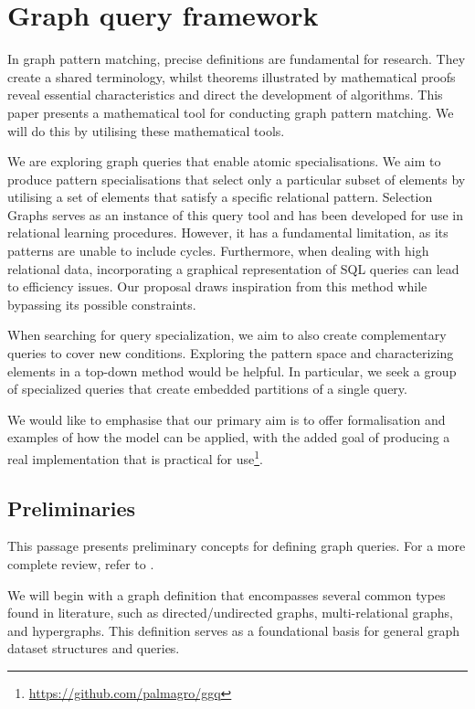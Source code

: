 \documentclass{article}%
\begin{document}
%
\clearpage%
\section{Graph query framework}
\label{ggq}

In graph pattern matching, precise definitions are fundamental for research. They create a shared terminology, whilst theorems illustrated by mathematical proofs reveal essential characteristics and direct the development of algorithms. This paper presents a mathematical tool for conducting graph pattern matching. We will do this by utilising these mathematical tools.

We are exploring graph queries that enable atomic specialisations. We aim to produce pattern specialisations that select only a particular subset of elements by utilising a set of elements that satisfy a specific relational pattern. Selection Graphs serves as an instance of this query tool and has been developed for use in relational learning procedures. However, it has a fundamental limitation, as its patterns are unable to include cycles. Furthermore, when dealing with high relational data, incorporating a graphical representation of SQL queries can lead to efficiency issues. Our proposal draws inspiration from this method while bypassing its possible constraints. 

When searching for query specialization, we aim to also create complementary queries to cover new conditions. Exploring the pattern space and characterizing elements in a top-down method would be helpful. In particular, we seek a group of specialized queries that create embedded partitions of a single query.

We would like to emphasise that our primary aim is to offer formalisation and examples of how the model can be applied, with the added goal of producing a real implementation that is practical for use\footnote{\url{https://github.com/palmagro/ggq}}.


\subsection{Preliminaries}

This passage presents preliminary concepts for defining graph queries. For a more complete review, refer to \citep{DBLP:journals/corr/abs-1708-03734}.  

We will begin with a graph definition that encompasses several common types found in literature, such as directed/undirected graphs, multi-relational graphs, and hypergraphs. This definition serves as a foundational basis for general graph dataset structures and queries.
\end{document}
